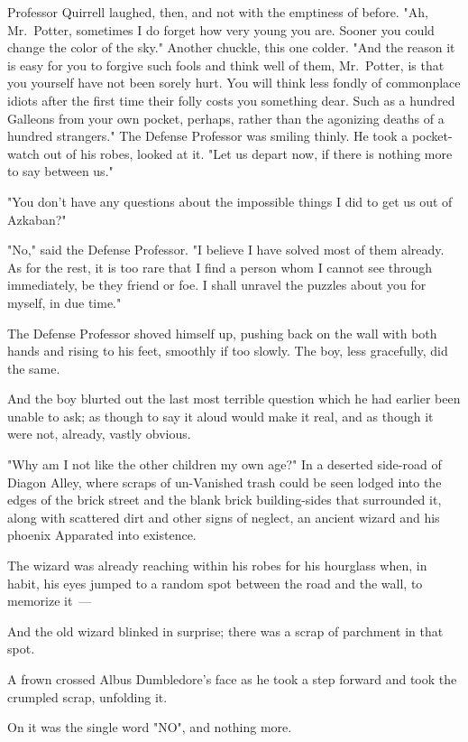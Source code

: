 Professor Quirrell laughed, then, and not with the emptiness of before. "Ah,
Mr.~Potter, sometimes I do forget how very young you are. Sooner you could
change the color of the sky." Another chuckle, this one colder. "And the reason
it is easy for you to forgive such fools and think well of them, Mr.~Potter, is
that you yourself have not been sorely hurt. You will think less fondly of
commonplace idiots after the first time their folly costs you something dear.
Such as a hundred Galleons from your own pocket, perhaps, rather than the
agonizing deaths of a hundred strangers." The Defense Professor was smiling
thinly. He took a pocket-watch out of his robes, looked at it. "Let us depart
now, if there is nothing more to say between us."

"You don't have any questions about the impossible things I did to get us out
of Azkaban?"

"No," said the Defense Professor. "I believe I have solved most of them
already. As for the rest, it is too rare that I find a person whom I cannot see
through immediately, be they friend or foe. I shall unravel the puzzles about
you for myself, in due time."

The Defense Professor shoved himself up, pushing back on the wall with both
hands and rising to his feet, smoothly if too slowly. The boy, less gracefully,
did the same.

And the boy blurted out the last most terrible question which he had earlier
been unable to ask; as though to say it aloud would make it real, and as though
it were not, already, vastly obvious.

"Why am I not like the other children my own age?"
\sbreak
In a deserted side-road of Diagon Alley, where scraps of un-Vanished trash
could be seen lodged into the edges of the brick street and the blank brick
building-sides that surrounded it, along with scattered dirt and other signs of
neglect, an ancient wizard and his phoenix Apparated into existence.

The wizard was already reaching within his robes for his hourglass when, in
habit, his eyes jumped to a random spot between the road and the wall, to
memorize it~---

And the old wizard blinked in surprise; there was a scrap of parchment in that
spot.

A frown crossed Albus Dumbledore's face as he took a step forward and took the
crumpled scrap, unfolding it.

On it was the single word "NO", and nothing more.

